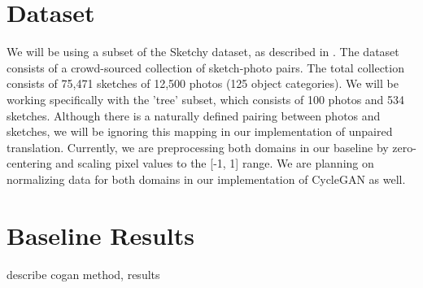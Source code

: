 \documentclass[10pt,twocolumn,letterpaper]{article}
\begin{document}
\section{Dataset}
We will be using a subset of the Sketchy dataset, as described in \cite{sangkloy2016sketchy}. The dataset consists of a crowd-sourced collection of sketch-photo pairs. The total collection consists of 75,471 sketches of 12,500 photos (125 object categories). We will be working specifically with the 'tree' subset, which consists of 100 photos and 534 sketches. Although there is a naturally defined pairing between photos and sketches, we will be ignoring this mapping in our implementation of unpaired translation. Currently, we are preprocessing both domains in our baseline by zero-centering and scaling pixel values to the [-1, 1] range. We are planning on normalizing data for both domains in our implementation of CycleGAN as well.

\section{Baseline Results}
describe cogan method, results

{\small


}
\end{document}
